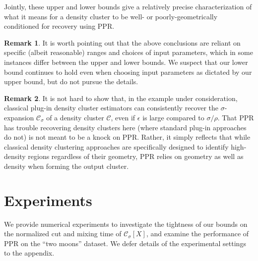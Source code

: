 \documentclass[11pt,twoside]{article}
\theoremstyle{definition}
\newtheorem{remark}{Remark}
\newcommand{\1}{\mathbbm{1}}
\newcommand{\Xbf}{X}
\newcommand{\Cset}{\mathcal{C}}
\newcommand{\Csig}{\Cset_{\sigma}}
\begin{document}
Jointly, these upper and lower bounds give a relatively precise characterization
of what it means for a density cluster to be well- or poorly-geometrically
conditioned for recovery using PPR. 

\begin{remark}
It is worth pointing out that the above conclusions are reliant on specific
(albeit reasonable) ranges and choices of input parameters, which in some
instances differ between the upper and lower bounds. We suspect that our lower
bound continues to hold even when choosing input parameters as dictated by our
upper bound, but do not pursue the details.
\end{remark}

\begin{remark}
It is not hard to show that, in the example under consideration, classical
plug-in density cluster estimators can consistently recover the
$\sigma$-expansion $\Csig$ of a density cluster $\Cset$, even if $\epsilon$ is
large compared to $\sigma/\rho$. That PPR has trouble recovering density
clusters here (where standard plug-in approaches do not) is not meant to
be a knock on PPR. Rather, it simply reflects that while classical density
clustering approaches are specifically designed to identify high-density regions
regardless of their geometry, PPR relies on geometry as well as density when
forming the output cluster. 
\end{remark}

\section{Experiments}
\label{sec: experiments}

We provide numerical experiments to investigate the tightness of our bounds on
the normalized cut and mixing time of $\Csig[\Xbf]$, and examine the performance
of PPR on the ``two moons'' dataset. We defer details of the experimental
settings to the appendix.   
\end{document}
